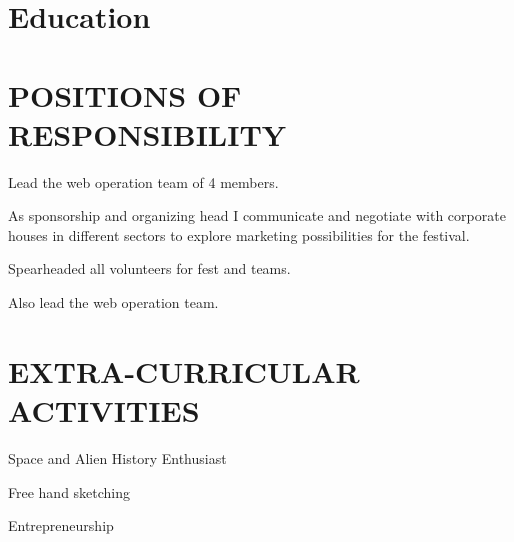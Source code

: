 \documentclass[]{space-monkey-cv}
\begin{document}
\lastupdated

%
%







\sectionsep

\section{Education}
\sectionsep








\section{POSITIONS OF RESPONSIBILITY}
\begin{tightemize}
	\item Lead the web operation team of 4 members.
\end{tightemize}

\begin{tightemize}
	\item As sponsorship and organizing head I communicate and negotiate with corporate houses in different sectors to explore marketing possibilities for the festival.
	\item Spearheaded all volunteers for fest and teams.
	\item Also lead the web operation team.
\end{tightemize}
\sectionsep

\section{EXTRA-CURRICULAR ACTIVITIES}

\begin{skill-env}
	\item Space and Alien History Enthusiast 
	\item Free hand sketching
	\item Entrepreneurship
\end{skill-env}
\sectionsep



\sectionsep
\end{document}

